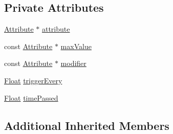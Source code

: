 \subsection*{Private Attributes}
\begin{DoxyCompactItemize}
\item 
\hyperlink{classZeta_1_1Attribute}{Attribute} $\ast$ \hyperlink{classZeta_1_1Regeneration_a4fa438adb70cb98b169aa2931378d48c}{attribute}
\item 
const \hyperlink{classZeta_1_1Attribute}{Attribute} $\ast$ \hyperlink{classZeta_1_1Regeneration_ad671097a7b0231886a723123b6edd4d3}{max\+Value}
\item 
const \hyperlink{classZeta_1_1Attribute}{Attribute} $\ast$ \hyperlink{classZeta_1_1Regeneration_aab9346cb0b0f4d353d51192d7c019a0d}{modifier}
\item 
\hyperlink{namespaceZeta_a1e0a1265f9b3bd3075fb0fabd39088ba}{Float} \hyperlink{classZeta_1_1Regeneration_a6aad295d1fb310f9bd575baaa8d124a3}{trigger\+Every}
\item 
\hyperlink{namespaceZeta_a1e0a1265f9b3bd3075fb0fabd39088ba}{Float} \hyperlink{classZeta_1_1Regeneration_ae9403b80316143c9293d069bb1dc88a5}{time\+Passed}
\end{DoxyCompactItemize}
\subsection*{Additional Inherited Members}


